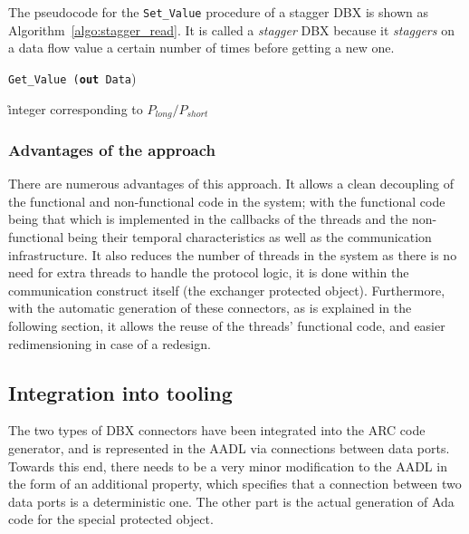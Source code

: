 The pseudocode for the \texttt{Set\_Value} procedure of a stagger DBX
is shown as Algorithm~\ref{algo:stagger_read}. It is called a
\emph{stagger} DBX because it \emph{staggers} on a data flow value a
certain number of times before getting a new one.

\begin{algorithm}
\label{algo:stagger_read}
\caption{\texttt{Get\_Value (\textbf{out} Data})}
\r{integer corresponding to $P_{long}/P_{short}$}
\SetLine
{}
\end{algorithm}

\subsubsection{Advantages of the approach}
There are numerous advantages of this approach. It allows a clean
decoupling of the functional and non-functional code in the system;
with the functional code being that which is implemented in the
callbacks of the threads and the non-functional being their temporal
characteristics as well as the communication infrastructure. It also
reduces the number of threads in the system as there is no need for
extra threads to handle the protocol logic, it is done within the
communication construct itself (the exchanger protected
object). Furthermore, with the automatic generation of these
connectors, as is explained in the following section, it allows the
reuse of the threads' functional code, and easier redimensioning in
case of a redesign.

\subsection{Integration into tooling}
\label{sec:implem}
The two types of DBX connectors have been integrated into the ARC code
generator, and is represented in the AADL via connections between data
ports. Towards this end, there needs to be a very minor modification
to the AADL in the form of an additional property, which specifies
that a connection between two data ports is a deterministic one. The
other part is the actual generation of Ada code for the special
protected object.

